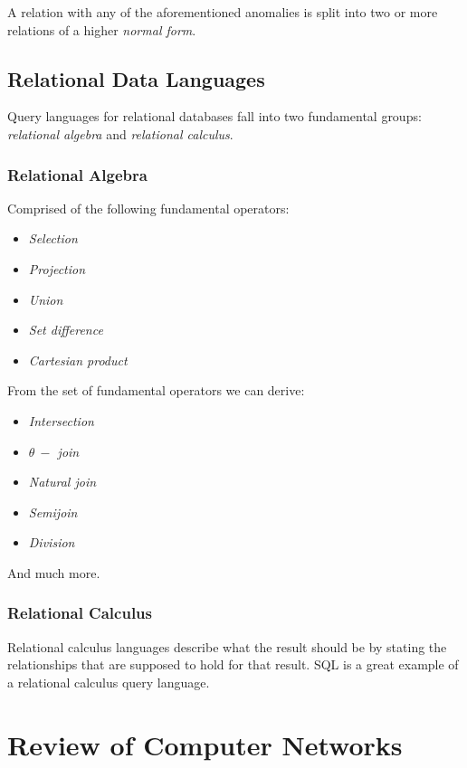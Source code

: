 \documentclass[12pt]{article}
\begin{document}
A relation with any of the aforementioned anomalies is split into two or more relations of a higher \textit{normal form}.

\subsection{Relational Data Languages}

Query languages for relational databases fall into two fundamental groups: \textit{relational algebra} and \textit{relational calculus}.

\subsubsection{Relational Algebra}

Comprised of the following fundamental operators:
\begin{itemize}
	\item \textit{Selection}
	\item \textit{Projection}
	\item \textit{Union}
	\item \textit{Set difference}
	\item \textit{Cartesian product}
\end{itemize}

From the set of fundamental operators we can derive:
\begin{itemize}
	\item \textit{Intersection}
	\item \textit{$\theta \ -$ join}
	\item \textit{Natural join}
	\item \textit{Semijoin}
	\item \textit{Division}
\end{itemize}

And much more.

\subsubsection{Relational Calculus}

Relational calculus languages describe what the result should be by stating the relationships that are supposed to hold for that result. SQL is a great example of a relational calculus query language. 

\section{Review of Computer Networks}
\end{document}
